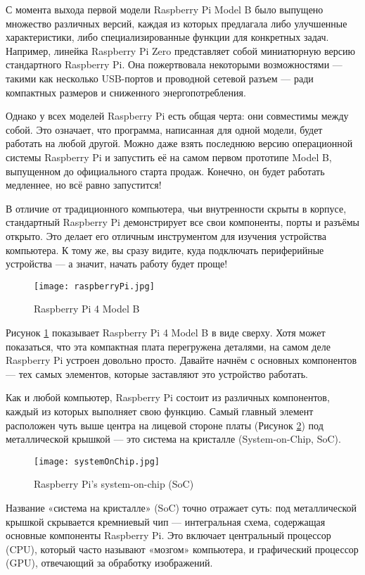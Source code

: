 С момента выхода первой модели Raspberry Pi Model B было выпущено множество различных версий, каждая из которых предлагала либо улучшенные характеристики, либо специализированные функции для конкретных задач. Например, линейка Raspberry Pi Zero представляет собой миниатюрную версию стандартного Raspberry Pi. Она пожертвовала некоторыми возможностями — такими как несколько USB-портов и проводной сетевой разъем — ради компактных размеров и сниженного энергопотребления.

Однако у всех моделей Raspberry Pi есть общая черта: они совместимы между собой. Это означает, что программа, написанная для одной модели, будет работать на любой другой.
Можно даже взять последнюю версию операционной системы Raspberry Pi и запустить её на самом первом прототипе Model B, выпущенном до официального старта продаж. Конечно, он будет работать медленнее, но всё равно запустится!

В отличие от традиционного компьютера, чьи внутренности скрыты в корпусе, стандартный Raspberry Pi демонстрирует все свои компоненты, порты и разъёмы открыто. Это делает его отличным инструментом для изучения устройства компьютера. К тому же, вы сразу видите, куда подключать периферийные устройства — а значит, начать работу будет проще!

\begin{figure}[H]
	\centering
	\texttt{[image: raspberryPi.jpg]}
	\caption{Raspberry Pi 4 Model B}
	\label{fig:raspberry4B}
\end{figure}

Рисунок \ref{fig:raspberry4B} показывает Raspberry Pi 4 Model B в виде сверху.
Хотя может показаться, что эта компактная плата перегружена деталями, на самом деле Raspberry Pi устроен довольно просто. Давайте начнём с основных компонентов — тех самых элементов, которые заставляют это устройство работать.


Как и любой компьютер, Raspberry Pi состоит из различных компонентов, каждый из которых выполняет свою функцию. Самый главный элемент расположен чуть выше центра на лицевой стороне платы (Рисунок \ref{fig:soc}) под металлической крышкой — это система на кристалле (System-on-Chip, SoC).

\begin{figure}[H]
	\centering
	\texttt{[image: systemOnChip.jpg]}
	\caption{Raspberry Pi’s system-on-chip (SoC)}
	\label{fig:soc}
\end{figure}

Название «система на кристалле» (SoC) точно отражает суть: под металлической крышкой скрывается кремниевый чип — интегральная схема, содержащая основные компоненты Raspberry Pi. Это включает центральный процессор (CPU), который часто называют «мозгом» компьютера, и графический процессор (GPU), отвечающий за обработку изображений.

